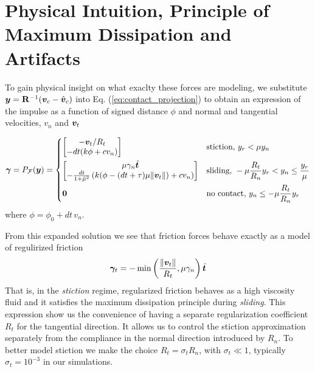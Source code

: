 \section{Physical Intuition, Principle of Maximum Dissipation and Artifacts}
\label{sec:physical_intuition}


To gain physical insight on what exaclty these forces are modeling, we
substitute ${\bm{y}}={\mathbf{R}}^{-1}({\bm{v}}_c - \hat{{\bm{v}}}_c)$ into Eq.
(\ref{eq:contact_projection}) to obtain an expression of the impulse as a
function of signed distance $\phi$ and normal and tangential velocities, $v_n$
and ${\bm{v}}_t$

\begin{equation}
	\bgamma = P_\mathcal{F}(\vf{y}) = 
\begin{dcases}
	\begin{bmatrix}
		-\vf{v}_t/R_t\\
		-dt(k\phi + c v_n)
	\end{bmatrix}
	& \text{stiction, } y_r < \mu y_n\\
	\begin{bmatrix}
		\mu\gamma_n\hat{\vf{t}}\\
		-\frac{dt}{1+\tilde\mu^2}\left(k(\phi-(dt+\tau)\mu\Vert\vf{v}_t\Vert) + cv_n \right)
	\end{bmatrix}
	& \text{sliding, } -\mu \frac{R_t}{R_n} y_r < y_n \leq \frac{y_r}{\mu}\\
    \vf{0} & \text{no contact, } y_n \leq -\mu \frac{R_t}{R_n} y_r
\end{dcases}	  
	\label{eq:gamma_piecewise}
\end{equation}
where $\phi= \phi_0 + dt\,v_n$.

From this expanded solution we see that friction forces behave exactly as a
model of regulirized friction
\begin{equation}
	{\bm\gamma}_t = -\min\left(\frac{\Vert{\bm{v}}_t\Vert}{R_t}, \mu\gamma_n\right)\hat{{\bm{t}}}
\end{equation}
That is, in the \textit{stiction} regime, regularized friction behaves as a high
viscosity fluid and it satisfies the maximum dissipation principle during
\textit{sliding}. This expression show us the convenience of having a separate
regularization coefficient $R_t$ for the tangential direction. It allows us to
control the stiction approximation separately from the compliance in the normal
direction introduced by $R_n$. To better model stiction we make the choice
$R_t=\sigma_t R_n$, with $\sigma_t \ll 1$, typically $\sigma_t=10^{-3}$ in our
simulations.

